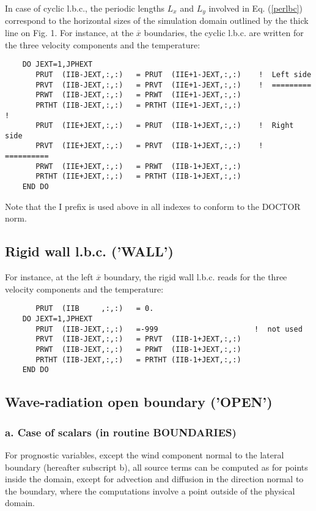 In case of cyclic l.b.c., the periodic lengths $L_x$ and $L_y$ involved in
Eq. (\ref{perlbc}) correspond to the horizontal sizes of the simulation domain
outlined by the thick line on Fig. 1.
For instance, at the $\overline x$ boundaries, the cyclic l.b.c. are written
for the three velocity components and the temperature:
\begin{verbatim}
    DO JEXT=1,JPHEXT
       PRUT  (IIB-JEXT,:,:)   = PRUT  (IIE+1-JEXT,:,:)    !  Left side
       PRVT  (IIB-JEXT,:,:)   = PRVT  (IIE+1-JEXT,:,:)    !  =========
       PRWT  (IIB-JEXT,:,:)   = PRWT  (IIE+1-JEXT,:,:)
       PRTHT (IIB-JEXT,:,:)   = PRTHT (IIE+1-JEXT,:,:)
!
       PRUT  (IIE+JEXT,:,:)   = PRUT  (IIB-1+JEXT,:,:)    !  Right side
       PRVT  (IIE+JEXT,:,:)   = PRVT  (IIB-1+JEXT,:,:)    !  ==========
       PRWT  (IIE+JEXT,:,:)   = PRWT  (IIB-1+JEXT,:,:)
       PRTHT (IIE+JEXT,:,:)   = PRTHT (IIB-1+JEXT,:,:)
    END DO
\end{verbatim}

Note that the I prefix is used above in all indexes to conform to the DOCTOR
norm.

\subsection{Rigid wall l.b.c. ('WALL')}

For instance, at the left $\overline x$ boundary, the rigid wall l.b.c.
reads for the three velocity components and the temperature:
\begin{verbatim}
       PRUT  (IIB     ,:,:)   = 0.
    DO JEXT=1,JPHEXT
       PRUT  (IIB-JEXT,:,:)   =-999                      !  not used
       PRVT  (IIB-JEXT,:,:)   = PRVT  (IIB-1+JEXT,:,:)
       PRWT  (IIB-JEXT,:,:)   = PRWT  (IIB-1+JEXT,:,:)
       PRTHT (IIB-JEXT,:,:)   = PRTHT (IIB-1+JEXT,:,:)
    END DO
\end{verbatim}

\subsection{Wave-radiation open boundary ('OPEN')}

\subsubsection{a. Case of scalars (in routine BOUNDARIES)}

For prognostic variables, except the wind component normal to the lateral
boundary (hereafter subscript b), all source terms can be computed as for
points inside the domain,
except for advection and diffusion in the direction normal to the
boundary, where the computations involve a point outside
of the physical domain.

